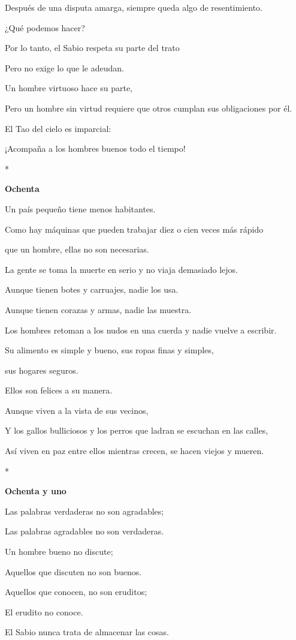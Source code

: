 Después de una disputa amarga, siempre queda algo de resentimiento.

¿Qué podemos hacer?

Por lo tanto, el Sabio respeta su parte del trato

Pero no exige lo que le adeudan.

Un hombre virtuoso hace su parte,

Pero un hombre sin virtud requiere que otros cumplan sus obligaciones
por él.

El Tao del cielo es imparcial:

¡Acompaña a los hombres buenos todo el tiempo!

*

\textbf{Ochenta}

Un país pequeño tiene menos habitantes.

Como hay máquinas que pueden trabajar diez o cien veces más rápido

que un hombre, ellas no son necesarias.

La gente se toma la muerte en serio y no viaja demasiado lejos.

Aunque tienen botes y carruajes, nadie los usa.

Aunque tienen corazas y armas, nadie las muestra.

Los hombres retoman a los nudos en una cuerda y nadie vuelve a escribir.

Su alimento es simple y bueno, sus ropas finas y simples,

sus hogares seguros.

Ellos son felices a su manera.

Aunque viven a la vista de sus vecinos,

Y los gallos bulliciosos y los perros que ladran se escuchan en las
calles,

Así viven en paz entre ellos mientras crecen, se hacen viejos y mueren.

*

\textbf{Ochenta y uno}

Las palabras verdaderas no son agradables;

Las palabras agradables no son verdaderas.

Un hombre bueno no discute;

Aquellos que discuten no son buenos.

Aquellos que conocen, no son eruditos;

El erudito no conoce.

El Sabio nunca trata de almacenar las cosas.

